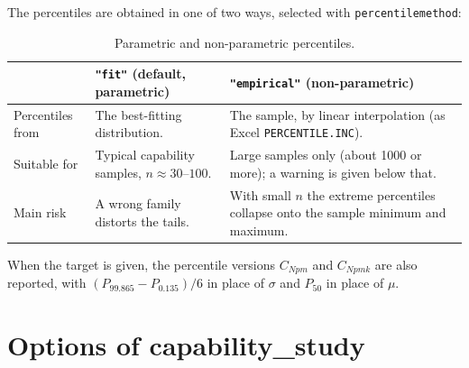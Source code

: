 \documentclass[a4paper,11pt,oneside,openany,parskip=half-,headings=standardclasses,toc=flat,numbers=noenddot]{scrbook}
\newcommand{\thead}[1]{{\sffamily\bfseries\footnotesize #1}}
\newcommand{\code}[1]{\texttt{\begingroup\def\_{\textunderscore\allowbreak}#1\endgroup}}
\begin{document}
The percentiles are obtained in one of two ways, selected with \code{percentile\_method}:

\begin{table}[!htp]
\caption{Parametric and non-parametric percentiles.}\label{tab:pct}
\small
\begin{tabularx}{\textwidth}{@{}P{26mm}LL@{}}
\toprule
 & \thead{\code{"fit"} (default, parametric)} & \thead{\code{"empirical"} (non-parametric)}\\
\midrule
Percentiles from & The best-fitting distribution. & The sample, by linear interpolation (as Excel \code{PERCENTILE.INC}).\\
Suitable for & Typical capability samples, $n \approx 30$--$100$. & Large samples only (about 1000 or more); a warning is given below that.\\
Main risk & A wrong family distorts the tails. & With small $n$ the extreme percentiles collapse onto the sample minimum and maximum.\\
\bottomrule
\end{tabularx}
\end{table}

When the target is given, the percentile versions $C_{Npm}$ and $C_{Npmk}$ are also reported, with
$(P_{99.865}-P_{0.135})/6$ in place of $\sigma$ and $P_{50}$ in place of $\mu$.

\section{Options of capability\_study}
\end{document}
